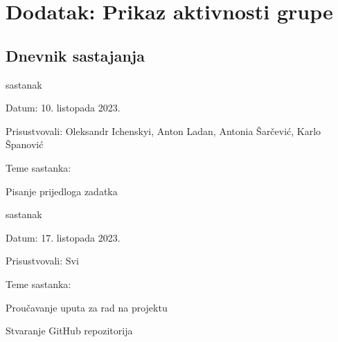 \chapter*{Dodatak: Prikaz aktivnosti grupe}

\section*{Dnevnik sastajanja}



\begin{packed_enum}

\item sastanak

\item[] \begin{packed_item}

	\item Datum: 10. listopada 2023.
	\item Prisustvovali: Oleksandr Ichenskyi, Anton Ladan, Antonia Šarčević, Karlo Španović
	\item Teme sastanka:
		\begin{packed_item}

			\item Pisanje prijedloga zadatka

		\end{packed_item}

\end{packed_item}

\item sastanak

\item[] \begin{packed_item}

	\item Datum: 17. listopada 2023.
	\item Prisustvovali: Svi
	\item Teme sastanka:
		\begin{packed_item}

			\item Proučavanje uputa za rad na projektu
			\item Stvaranje GitHub repozitorija

		\end{packed_item}


\end{packed_item}
\end{packed_enum}
